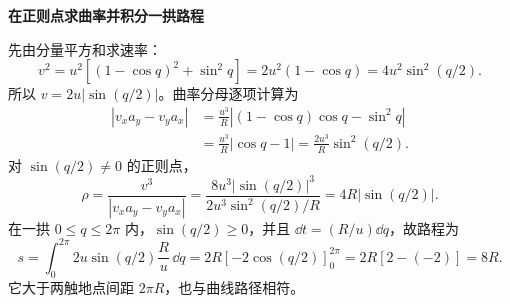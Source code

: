 \begin{solution}
\par\medskip{}\noindent\textbf{在正则点求曲率并积分一拱路程}\par\nobreak
先由分量平方和求速率：
\[
v^2=u^2[(1-\cos q)^2+\sin^2q]
=2u^2(1-\cos q)=4u^2\sin^2(q/2).
\]
所以 $v=2u|\sin(q/2)|$。曲率分母逐项计算为
\begin{align*}
|v_xa_y-v_ya_x|
&=\frac{u^3}{R}|(1-\cos q)\cos q-\sin^2q|\\
&=\frac{u^3}{R}|\cos q-1|
=\frac{2u^3}{R}\sin^2(q/2).
\end{align*}
对 $\sin(q/2)\ne0$ 的正则点，
\[
\rho=\frac{v^3}{|v_xa_y-v_ya_x|}
=\frac{8u^3|\sin(q/2)|^3}{2u^3\sin^2(q/2)/R}
=4R|\sin(q/2)|.
\]
在一拱 $0\le q\le2\pi$ 内，$\sin(q/2)\ge0$，并且
$\dd t=(R/u)\dd q$，故路程为
\[
s=\int_0^{2\pi}2u\sin(q/2)\frac Ru\,\dd q
=2R[-2\cos(q/2)]_0^{2\pi}
=2R[2-(-2)]=8R.
\]
它大于两触地点间距 $2\pi R$，也与曲线路径相符。\end{solution}

